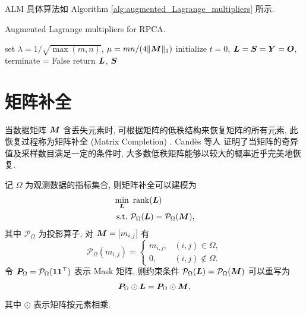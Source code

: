 \documentclass[12pt]{article}
\begin{document}
ALM 具体算法如 Algorithm \ref{alg:augmented_Lagrange_multipliers} 所示.

\begin{algorithm}[!htbp]
  \label{alg:augmented_Lagrange_multipliers}
  \caption{Augmented Lagrange multipliers for RPCA.}
  set $\lambda=1/\sqrt{\max(m,n)}$, $\mu=mn/(4\|\bm{M}\|_1)$\;
  initialize $t=0$, $\bm{L}=\bm{S}=\bm{Y}=\bm{O}$, terminate = False\;
  return $\bm{L}$, $\bm{S}$\;
\end{algorithm}

\section{矩阵补全}

当数据矩阵 $\bm{M}$ 含丢失元素时, 可根据矩阵的低秩结构来恢复矩阵的所有元素, 此恢复过程称为矩阵补全 (Matrix Completion) \cite{candes2012exact}. Candès 等人 \cite{candes2012exact} 证明了当矩阵的奇异值及采样数目满足一定的条件时, 大多数低秩矩阵能够以较大的概率近乎完美地恢复.

记 $\Omega$ 为观测数据的指标集合, 则矩阵补全可以建模为
\begin{equation}
  \begin{aligned}
    &\min_{\bm{L}}~\operatorname{rank}(\bm{L}) \\
    &~\text{s.t.}~\mathcal{P}_\Omega(\bm{L})=\mathcal{P}_\Omega(\bm{M}),\\
  \end{aligned}
\end{equation}
其中 $\mathcal{P}_\Omega$ 为投影算子, 对 $\bm{M}=[m_{i,j}]$ 有
\begin{equation}
  \mathcal{P}_\Omega(m_{i,j})=\begin{cases}
    m_{i,j}, & (i,j)\in\Omega, \\
    0, & (i,j)\notin\Omega.
  \end{cases}
\end{equation}
令 $\bm{P}_\Omega=\mathcal{P}_\Omega(\bm{1}\bm{1}^\top)$ 表示 Mask 矩阵, 则约束条件 $\mathcal{P}_\Omega(\bm{L})=\mathcal{P}_\Omega(\bm{M})$ 可以重写为
\begin{equation}
  \bm{P}_\Omega\odot\bm{L}=\bm{P}_\Omega\odot\bm{M},
\end{equation}
其中 $\odot$ 表示矩阵按元素相乘.
\end{document}
